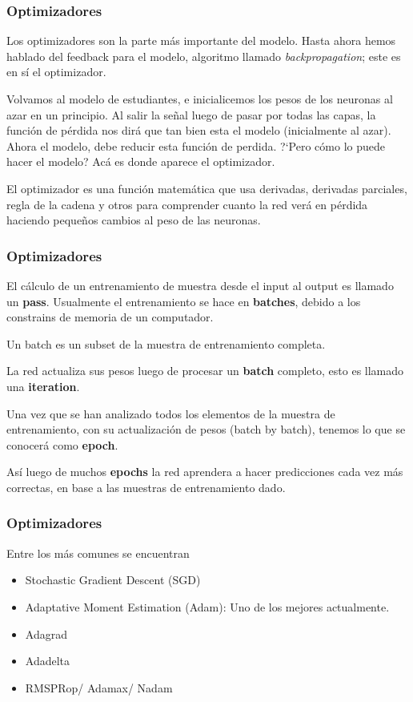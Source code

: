 \documentclass[9pt, xcolor=svgnames, dvipsnames]{beamer}
\begin{document}
\begin{frame}[fragile]
\frametitle{Optimizadores}
Los optimizadores son la parte m\'as importante del modelo. Hasta ahora hemos hablado del feedback para el modelo, algoritmo llamado \textit{backpropagation}; este es en s\'i el optimizador.

Volvamos al modelo de estudiantes, e inicialicemos los pesos de los neuronas al azar en un principio. Al salir la señal luego de pasar por todas las capas, la función de pérdida nos dirá que tan bien esta el modelo (inicialmente al azar). Ahora el modelo, debe reducir esta función de perdida. ?`Pero cómo lo puede hacer el modelo? Acá es donde aparece el optimizador.

\begin{tcolorbox}
El optimizador es una funci\'on matem\'atica que usa derivadas, derivadas parciales, regla de la cadena y otros para comprender cuanto la red ver\'a en p\'erdida haciendo peque\~nos cambios al peso de las neuronas.
\end{tcolorbox}
\end{frame}

\begin{frame}
\frametitle{Optimizadores}
El c\'alculo de un entrenamiento de muestra desde el input al output es llamado un \textbf{pass}. Usualmente el entrenamiento se hace en \textbf{batches}, debido a los constrains de memoria de un computador.
\begin{tcolorbox}
Un batch es un subset de la muestra de entrenamiento completa.
\end{tcolorbox}

La red actualiza sus pesos luego de procesar un \textbf{batch} completo, esto es llamado una \textbf{iteration}.
\begin{tcolorbox}
Una vez que se han analizado todos los elementos de la muestra de entrenamiento, con su actualizaci\'on de pesos (batch by batch), tenemos lo que se conocer\'a como \textbf{epoch}.
\end{tcolorbox}

As\'i luego de muchos \textbf{epochs} la red aprendera a hacer predicciones cada vez m\'as correctas, en base a las muestras de entrenamiento dado.
\end{frame}

\begin{frame}
\frametitle{Optimizadores}
Entre los m\'as comunes se encuentran
\begin{itemize}
    \item Stochastic Gradient Descent (SGD)
    \item Adaptative Moment Estimation (Adam): Uno de los mejores actualmente.
    \item Adagrad
    \item Adadelta
    \item RMSPRop/ Adamax/ Nadam
\end{itemize}
\end{frame}
\end{document}
